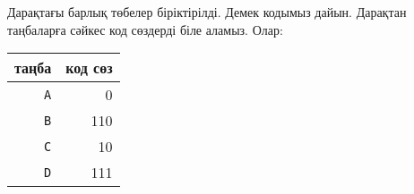 Дарақтағы барлық төбелер біріктірілді. Демек 
кодымыз дайын. 
Дарақтан таңбаларға сәйкес код сөздерді біле аламыз. Олар:
\begin{center}
\begin{tabular}{rr}
таңба & код сөз \\
\hline
\texttt{A} & 0 \\
\texttt{B} & 110 \\
\texttt{C} & 10 \\
\texttt{D} & 111 \\
\end{tabular}
\end{center}
